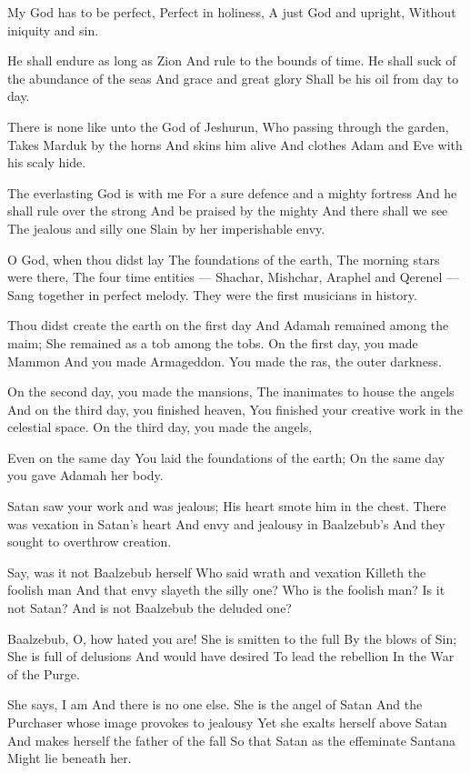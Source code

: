 \documentclass[
]{book}
\begin{document}
My God has to be perfect,
Perfect in holiness,
A just God and upright,
Without iniquity and sin.

He shall endure as long as Zion
And rule to the bounds of time.
He shall suck of the abundance of the seas
And grace and great glory
Shall be his oil from day to day.

There is none like unto the God of Jeshurun,
Who passing through the garden,
Takes Marduk by the horns
And skins him alive
And clothes Adam and Eve with his scaly hide.

The everlasting God is with me
For a sure defence and a mighty fortress
And he shall rule over the strong
And be praised by the mighty
And there shall we see
The jealous and silly one
Slain by her imperishable envy.

O God, when thou didst lay
The foundations of the earth,
The morning stars were there,
The four time entities ---
Shachar, Mishchar, Araphel and Qerenel ---
Sang together in perfect melody.
They were the first musicians in history.

Thou didst create the earth on the first day
And Adamah remained among the maim;
She remained as a tob among the tobs.
On the first day, you made Mammon
And you made Armageddon.
You made the ras, the outer darkness.

On the second day, you made the mansions,
The inanimates to house the angels
And on the third day, you finished heaven,
You finished your creative work in the celestial space.
On the third day, you made the angels,

Even on the same day
You laid the foundations of the earth;
On the same day you gave Adamah her body.

Satan saw your work and was jealous;
His heart smote him in the chest.
There was vexation in Satan's heart
And envy and jealousy in Baalzebub's
And they sought to overthrow creation.

Say, was it not Baalzebub herself
Who said wrath and vexation
Killeth the foolish man
And that envy slayeth the silly one?
Who is the foolish man?
Is it not Satan?
And is not Baalzebub the deluded one?

Baalzebub, O, how hated you are!
She is smitten to the full
By the blows of Sin;
She is full of delusions
And would have desired
To lead the rebellion
In the War of the Purge.

She says, I am
And there is no one else.
She is the angel of Satan
And the Purchaser whose image provokes to jealousy
Yet she exalts herself above Satan
And makes herself the father of the fall
So that Satan as the effeminate Santana
Might lie beneath her.
\end{document}
